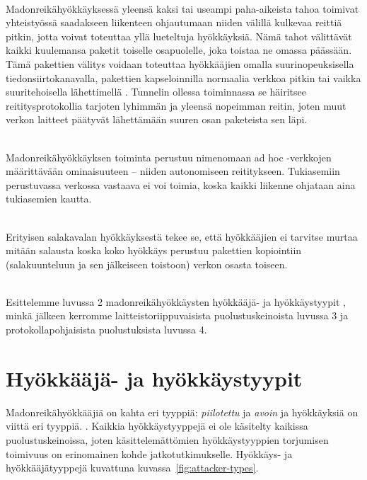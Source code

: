 \documentclass[finnish]{tktltiki2}
\theoremstyle{definition}
\theoremstyle{remark}
\begin{document}
\noindent \\
Madonreikähyökkäyksessä yleensä kaksi tai useampi paha-aikeista tahoa toimivat yhteistyössä saadakseen liikenteen ohjautumaan niiden välillä kulkevaa reittiä pitkin, jotta voivat toteuttaa yllä lueteltuja hyökkäyksiä. Nämä tahot välittävät kaikki kuulemansa paketit toiselle osapuolelle, joka toistaa ne omassa päässään. Tämä pakettien välitys voidaan toteuttaa hyökkääjien omalla suurinopeuksisella tiedonsiirtokanavalla, pakettien kapseloinnilla normaalia verkkoa pitkin tai vaikka suuritehoisella lähettimellä \cite{liteworp}. Tunnelin ollessa toiminnassa se häiritsee reititysprotokollia tarjoten lyhimmän ja yleensä nopeimman reitin, joten muut verkon laitteet päätyvät lähettämään suuren osan paketeista sen läpi. 

\noindent \\
Madonreikähyökkäyksen toiminta perustuu nimenomaan ad hoc -verkkojen määrittävään ominaisuuteen -- niiden autonomiseen reititykseen. Tukiasemiin perustuvassa verkossa vastaava ei voi toimia, koska kaikki liikenne ohjataan aina tukiasemien kautta.

\noindent \\
Erityisen salakavalan hyökkäyksestä tekee se, että hyökkääjien ei tarvitse murtaa mitään salausta koska koko hyökkäys perustuu pakettien kopiointiin (salakuunteluun ja sen jälkeiseen toistoon) verkon osasta toiseen.

\noindent \\
Esittelemme luvussa 2 madonreikähyökkäysten hyökkääjä- \cite{delphi} ja hyökkäystyypit \cite{liteworp}, minkä jälkeen kerromme laitteistoriippuvaisista puolustuskeinoista luvussa 3 ja protokollapohjaisista puolustuksista luvussa 4.

% 
% 
% 
% 
% 
% 
\section{Hyökkääjä- ja hyökkäystyypit}
% 
% 
% 
% 
% 
% 
% 
% 
% 
% 

Madonreikähyökkääjiä on kahta eri tyyppiä: \emph{piilotettu} ja \emph{avoin} \cite{delphi} ja hyökkäyksiä on viittä eri tyyppiä. \cite{liteworp}. Kaikkia hyökkäystyyppejä ei ole käsitelty kaikissa puolustuskeinoissa, joten käsittelemättömien hyökkäystyyppien torjumisen toimivuus on erinomainen kohde jatkotutkimukselle. Hyökkäys- ja hyökkääjätyyppejä kuvattuna kuvassa~\ref{fig:attacker-types}.
\end{document}
